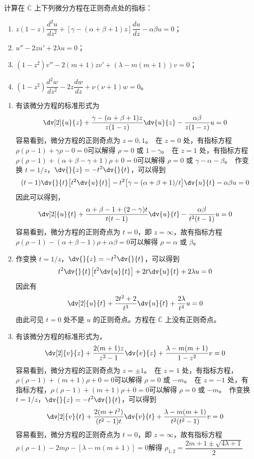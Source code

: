 \begin{question}
计算在 \(\overline{\mathbb{C}}\) 上下列微分方程在正则奇点处的指标：
\begin{enumerate}
  \item \(z(1-z)\dfrac{d^2u}{dz^2}+[\gamma-(\alpha+\beta+1)z]\dfrac{du}{dz}-\alpha\beta u=0\)；
  \item \(u''-2z u'+2\lambda u=0\)；
  \item \((1-z^2)v''-2(m+1)z v'+(\lambda-m(m+1))v=0\)；
  \item \((1-z^2)\dfrac{d^2w}{dz^2}-2z\dfrac{dw}{dz}+\nu(\nu+1)w=0\)。
\end{enumerate}
\begin{solution}
\begin{enumerate}
  \item 有该微分方程的标准形式为 \[ \dv[2]{u}{z}+\frac{\gamma-(\alpha+\beta+1)z}{z(1-z)}\dv{u}{z}-\frac{\alpha\beta}{z(1-z)}u=0 \]容易看到，微分方程的正则奇点为 \(z=0,1\)。\ 在 \(z=0\) 处，有指标方程 \(\rho(\rho-1)+\gamma\rho-0=0\)可以解得 \(\rho=0\) 或 \(1-\gamma\)。\ 在 \(z=1\) 处，有指标方程 \(\rho(\rho-1)+(\alpha+\beta-\gamma+1)\rho+0=0\)可以解得 \(\rho=0\) 或 \(\gamma-\alpha-\beta\)。\ 作变换 \(t=1/z\)，\(\displaystyle\dv{}{z}=-t^2\dv{}{t}\)，可以得到 \[ (t-1)\dv{}{t}\bigl[t^2\dv{u}{t}\bigr]-t^2\bigl[\gamma-(\alpha+\beta+1)/t\bigr]\dv{u}{t}-\alpha\beta u=0 \]因此可以得到，\[ \dv[2]{u}{t}+\frac{\alpha+\beta-1+(2-\gamma)t}{t(t-1)}\dv{u}{t}-\frac{\alpha\beta}{t^2(t-1)}u=0 \]容易看到，微分方程的正则奇点为 \(t=0\)，即 \(z=\infty\)，故有指标方程 \(\rho(\rho-1)-(\alpha+\beta-1)\rho+\alpha\beta=0\)可以解得 \(\rho=\alpha\) 或 \(\beta\)。

  \item 作变换 \(t=1/z\)，\(\displaystyle\dv{}{z}=-t^2\dv{}{t}\)，可以得到 \[ t^2\dv{}{t}\bigl[t^2\dv{u}{t}\bigr]+2t\dv{u}{t}+2\lambda u=0 \]因此有 \[ \dv[2]{u}{t}+\frac{2t^2+2}{t^3}\dv{u}{t}+\frac{2\lambda}{t^4}u=0 \]由此可见 \(t=0\) 处不是 \(u\) 的正则奇点。方程在 \(\overline{\mathbb{C}}\) 上没有正则奇点。

  \item 有该微分方程的标准形式为，\[ \dv[2]{v}{z}+\frac{2(m+1)z}{z^2-1}\dv{v}{z}+\frac{\lambda-m(m+1)}{1-z^2}v=0 \]容易看到，微分方程的正则奇点为 \(z=\pm1\)。\ 在 \(z=1\) 处，有指标方程，\(\rho(\rho-1)+(m+1)\rho+0=0\)可以解得 \(\rho=0\) 或 \(-m\)。\ 在 \(z=-1\) 处，有指标方程，\(\rho(\rho-1)+(m+1)\rho+0=0\)可以解得 \(\rho=0\) 或 \(-m\)。\ 作变换 \(t=1/z\)，\(\displaystyle\dv{}{z}=-t^2\dv{}{t}\)，可以得到 \[ \dv[2]{v}{t}+\frac{2(m+t^2)}{(t^2-1)t}\dv{v}{t}+\frac{\lambda-m(m+1)}{t^2(t^2-1)}v=0 \]容易看到，微分方程的正则奇点为 \(t=0\)，即 \(z=\infty\)，故有指标方程 \(\rho(\rho-1)-2m\rho-[\lambda-m(m+1)]=0\)解得 \(\rho_{1,2}=\dfrac{2m+1\pm\sqrt{4\lambda+1}}{2}\)


\end{enumerate}
\end{solution}
\end{question}
